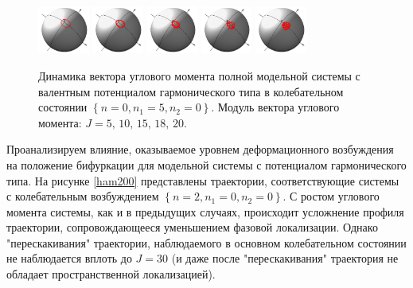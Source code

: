 \begin{figure}[H]
  \centering
	\includegraphics[width=0.15\textwidth]{../pictures/HarmGroundState50/plot_J=5.png}
	\includegraphics[width=0.15\textwidth]{../pictures/HarmGroundState50/plot_J=10.png}
	\includegraphics[width=0.15\textwidth]{../pictures/HarmGroundState50/plot_J=15.png}
	\includegraphics[width=0.15\textwidth]{../pictures/HarmGroundState50/plot_J=18.png}
	\includegraphics[width=0.15\textwidth]{../pictures/HarmGroundState50/plot_J=20.png}
	\caption{Динамика вектора углового момента полной модельной системы с валентным потенциалом гармонического типа в колебательном состоянии $\left\{ n = 0, n_1 = 5, n_2 = 0 \right\}$. Модуль вектора углового момента: $J = 5, \, 10, \, 15, \, 18, \, 20$.}	
\label{fig:harm050}
\end{figure}

Проанализируем влияние, оказываемое уровнем деформационного возбуждения на положение бифуркации для модельной системы с потенциалом гармонического типа. На рисунке \eqref{ham200} представлены траектории, соответствующие системы с колебательным возбуждением $\left\{ n = 2, n_1 = 0, n_2 = 0 \right\}$. С ростом углового момента системы, как и в предыдущих случаях, происходит усложнение профиля траектории, сопровождающееся уменьшением фазовой локализации. Однако "перескакивания" траектории, наблюдаемого в основном колебательном состоянии не наблюдается вплоть до $J = 30$ (и даже после "перескакивания" траектория не обладает пространственной локализацией). 

